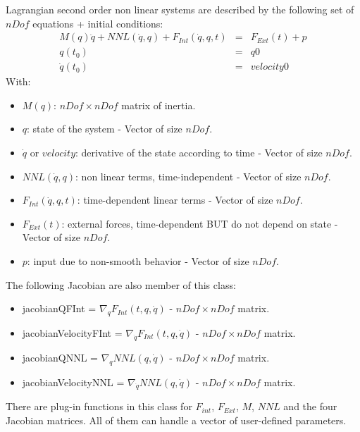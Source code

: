 \documentclass[10pt]{report}
\begin{document}
Lagrangian second order non linear systems are described by the following set of$nDof$ equations + initial conditions:
\begin{eqnarray}
 M(q) \ddot q + NNL(\dot q, q) + F_{Int}(\dot q , q , t) &=& F_{Ext}(t) + p \\
 q(t_0) &=& q0 \\
 \dot q(t_0) &=& velocity0 
\end{eqnarray}
With:
\begin{itemize}
\item $M(q)$: $nDof\times nDof$ matrix of inertia.
\item $q$: state of the system - Vector of size $nDof$.
\item $\dot q$ or $velocity$: derivative of the state according to time - Vector of size $nDof$.
\item $NNL(\dot q, q)$:  non linear terms, time-independent - Vector of size $nDof$.
\item $F_{Int}(\dot q , q , t)$: time-dependent linear terms - Vector of size $nDof$.
\item $F_{Ext}(t)$: external forces, time-dependent BUT do not depend on state - Vector of size $nDof$.
\item $p$: input due to non-smooth behavior - Vector of size $nDof$.
\end{itemize}

The following Jacobian are also member of this class:
\begin{itemize}
\item jacobianQFInt = $\nabla_q F_{Int}(t,q,\dot q)$ - $nDof\times nDof$ matrix.
\item jacobianVelocityFInt = $\nabla_{\dot q} F_{Int}(t,q,\dot q)$ - $nDof\times nDof$ matrix.
\item jacobianQNNL = $\nabla_q NNL(q,\dot q)$ - $nDof\times nDof$ matrix.
\item jacobianVelocityNNL = $\nabla_{\dot q}NNL(q,\dot q)$ - $nDof\times nDof$ matrix.
\end{itemize}


There are plug-in functions in this class for $F_{int}$, $F_{Ext}$, $M$, $NNL$ and the four Jacobian matrices. All
of them can handle a vector of user-defined parameters. \\
\end{document}
